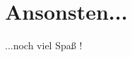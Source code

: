 \section{Ansonsten...}
\begin{frame}
    \slidehead
    \vspace{\fill}
    \begin{center}
        \huge ...noch viel Spaß !
    \end{center}
    \vspace{\fill}
\end{frame}

